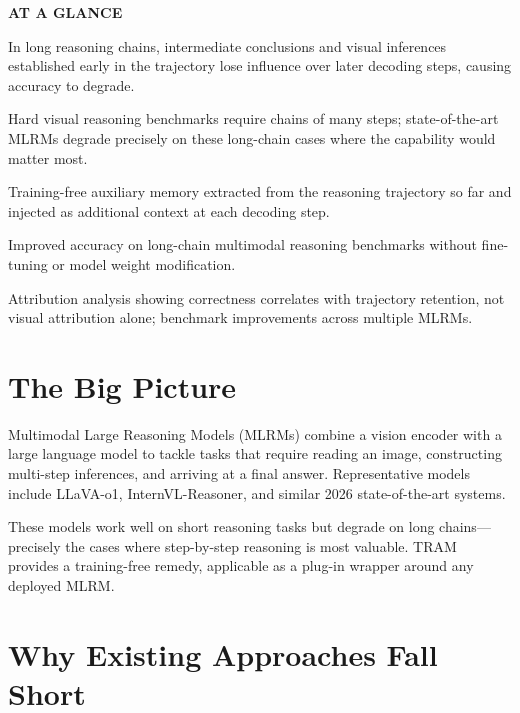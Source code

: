 \documentclass[10pt,twocolumn]{article}
\begin{document}
\begin{mdframed}[backgroundcolor=boxgray,linecolor=rulered,linewidth=1pt,
    innerleftmargin=6pt,innerrightmargin=6pt,
    innertopmargin=6pt,innerbottommargin=6pt]
\textbf{\small AT A GLANCE}\par\vspace{4pt}
\begin{description}[leftmargin=0pt,labelsep=4pt,itemsep=2pt,parsep=0pt,
    font=\small\bfseries]
  \item[Problem:] In long reasoning chains, intermediate conclusions and
    visual inferences established early in the trajectory lose influence over
    later decoding steps, causing accuracy to degrade.
  \item[Why it matters:] Hard visual reasoning benchmarks require chains of
    many steps; state-of-the-art MLRMs degrade precisely on these long-chain
    cases where the capability would matter most.
  \item[Method:] Training-free auxiliary memory extracted from the reasoning
    trajectory so far and injected as additional context at each decoding step.
  \item[Result:] Improved accuracy on long-chain multimodal reasoning benchmarks
    without fine-tuning or model weight modification.
  \item[Evidence:] Attribution analysis showing correctness correlates with
    trajectory retention, not visual attribution alone; benchmark improvements
    across multiple MLRMs.
\end{description}
\end{mdframed}

\section{The Big Picture}

Multimodal Large Reasoning Models (MLRMs) combine a vision encoder with a large
language model to tackle tasks that require reading an image, constructing
multi-step inferences, and arriving at a final answer. Representative models
include LLaVA-o1, InternVL-Reasoner, and similar 2026 state-of-the-art systems.

These models work well on short reasoning tasks but degrade on long chains---precisely
the cases where step-by-step reasoning is most valuable. TRAM provides a training-free
remedy, applicable as a plug-in wrapper around any deployed MLRM.

\section{Why Existing Approaches Fall Short}
\end{document}
